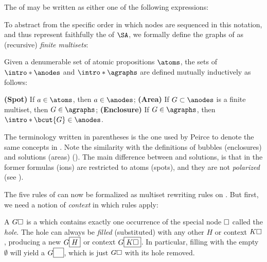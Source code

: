 \begin{example}
The  of  may be written as either one of the
following expressions:
\end{example}

To abstract from the specific order in which nodes are sequenced in this
notation, and thus represent faithfully the  of $\SA$, we formally
define the graphs of  as (recursive) \emph{finite multisets}:

\begin{scope}

\begin{definition}[Graph] 
  
  Given a denumerable set of atomic propositions $\atoms$, the sets of
   $\intro*\anodes$ and 
  $\intro*\agraphs$ are defined mutually inductively as follows:
  \begin{itemize}
    \itemAP \textbf{(Spot)} If $a \in \atoms$, then $a \in \anodes$;
    \itemAP \textbf{(Area)} If $G \subset \anodes$ is a finite multiset, then $G
    \in \agraphs$;
    \itemAP \textbf{(Enclosure)} If $G \in \agraphs$, then $\intro*\bcut{G} \in
    \anodes$.
  \end{itemize}
\end{definition}
The terminology written in parentheses is the one used by Peirce to denote the
same concepts in . Note the similarity with
the definitions of bubbles (enclosures) and solutions (areas)
(). The main difference between  and solutions,
is that in the former formulas (ions) are restricted to atoms (spots), and they
are not \emph{polarized} (see ).

The five rules of  can now be formalized as multiset rewriting rules
on . But first, we need a notion of \emph{context} in which rules
apply:

\begin{definition}[Context]
  A  $G\square$ is a  which contains exactly one
  occurrence of the special node $\square$ called the \emph{hole}. The hole can
  always be \emph{filled} (substituted) with any other  $H$ or context
  $K\square$, producing a new  $G\fbox{$H$}$ or context $G\fbox{$K\square$}$.
  In particular, filling with the empty  $\emptyset$ will yield a 
  $G\fbox{$\phantom{G}$}$, which is just $G\square$ with its hole removed.
\end{definition}


\end{scope}
